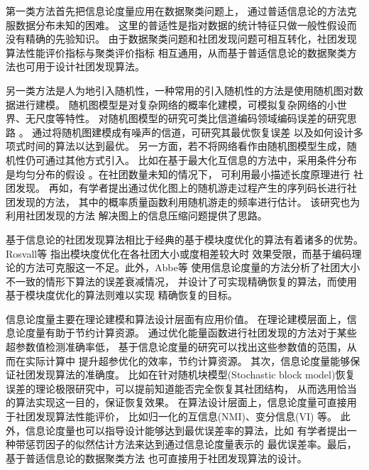 第一类方法首先把信息论度量应用在数据聚类问题上，
通过普适信息论的方法克服数据分布未知的困难\cite{raman20219}。
这里的普适性是指对数据的统计特征只做一般性假设而没有精确的先验知识。
由于数据聚类问题和社团发现问题可相互转化，社团发现算法性能评价指标与聚类评价指标
相互通用，从而基于普适信息论的数据聚类方法也可用于设计社团发现算法。

另一类方法是人为地引入随机性，一种常用的引入随机性的方法是使用随机图对数据进行建模。
随机图模型是对复杂网络的概率化建模，可模拟复杂网络的小世界、无尺度等特性。
对随机图模型的研究可类比信道编码领域编码误差的研究思路 \cite{abbe2015community}。
通过将随机图建模成有噪声的信道，可研究其最优恢复误差
以及如何设计多项式时间的算法以达到最优。
另一方面，若不将网络看作由随机图模型生成，随机性仍可通过其他方式引入。
比如在基于最大化互信息的方法中，采用条件分布是均匀分布的假设
\cite{rosvall2007information}。在社团数量未知的情况下，
可利用最小描述长度原理进行
社团发现\cite{chakrabarti2004autopart,rosvall2007information}。
再如，有学者提出通过优化图上的随机游走过程产生的序列码长进行社团发现的方法，
其中的概率质量函数利用随机游走的频率进行估计\cite{rosvall2008mcl}。
该研究也为利用社团发现的方法
解决图上的信息压缩问题提供了思路\cite{abbe17sideinfo}。

基于信息论的社团发现算法相比于经典的基于模块度优化的算法有着诸多的优势。
Rosvall等\cite{rosvall2007information} 指出模块度优化在各社团大小或度相差较大时
效果受限，而基于编码理论的方法可克服这一不足。此外，Abbe等\cite{abbe2015community,hajek2016achieving} 
使用信息论度量的方法分析了社团大小不一致的情形下算法的误差衰减情况，
并设计了可实现精确恢复的算法，而使用基于模块度优化的算法则难以实现
精确恢复的目标。

信息论度量主要在理论建模和算法设计层面有应用价值。
在理论建模层面上，信息论度量有助于节约计算资源。
通过优化能量函数进行社团发现的方法对于某些超参数值检测准确率低，
基于信息论度量的研究可以找出这些参数值的范围，从而在实际计算中
提升超参优化的效率，节约计算资源\cite{ye2020exact}。
其次，信息论度量能够保证社团发现算法的准确度。
比如在针对随机块模型(Stochastic block model)恢复误差的理论极限研究中，可以提前知道能否完全恢复其社团结构，
从而选用恰当的算法实现这一目的，保证恢复效果\cite{abbe2015community}。
在算法设计层面上，信息论度量可直接用于社团发现算法性能评价，
比如归一化的互信息(NMI)\cite{Danon_2005}、变分信息(VI) \cite{2007Comparing}等。
此外，信息论度量也可以指导设计能够达到最优误差率的算法，比如
有学者提出一种带惩罚因子的似然估计方法来达到通过信息论度量表示的
最优误差率\cite{zhang2016}。最后，基于普适信息论的数据聚类方法
也可直接用于社团发现算法的设计\cite{gokcay2002clustering, chan2017pin, app12094203}。

